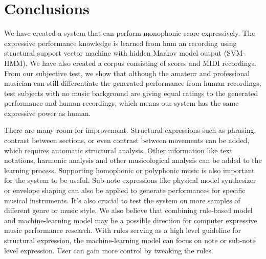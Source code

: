 \chapter{Conclusions}
We have created a system that can perform monophonic score expressively. The expressive performance knowledge is learned from hum an recording using structural support vector machine with hidden Markov model output (SVM-HMM). We have also created a corpus consisting of scores and MIDI recordings. From our subjective test, we show that although the amateur and professional musician can still differentiate the generated performance from human recordings, test subjects with no music background are giving equal ratings to the generated performance and human recordings, which means our system has the same expressive power as human.

There are many room for improvement. Structural expressions such as phrasing, contrast between sections, or even contrast between movements can be added, which requires automatic structural analysis. Other information like text notations, harmonic analysis and other musicological analysis can be added to the learning process. Supporting homophonic or polyphonic music is also important for the system to be useful. Sub-note expressions like physical model synthesizer or envelope shaping can also be applied to generate performances for specific musical instruments. It's also crucial to test the system on more samples of different genre or music style. We also believe that combining rule-based model and machine-learning model may be a possible direction for computer expressive music performance research. With rules serving as a high level guideline for structural expression, the machine-learning model can focus on note or sub-note level expression. User can gain more control by tweaking the rules.


